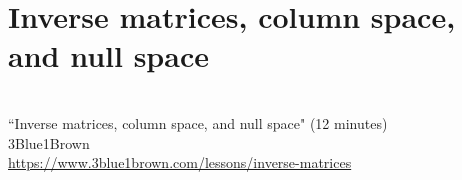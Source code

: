 \section{Inverse matrices, column space, and null space}
\begin{bookfigure}
   \\
  ``Inverse matrices, column space, and null space" (12 minutes) \\
  \footnotesize 3Blue1Brown \\
  \url{https://www.3blue1brown.com/lessons/inverse-matrices}
\end{bookfigure}
